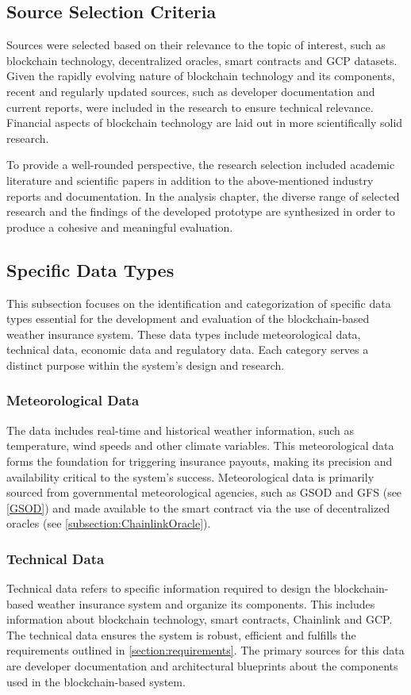 \subsection{Source Selection Criteria}
Sources were selected based on their relevance to the topic of interest, such as blockchain technology, decentralized oracles, smart contracts and GCP datasets. Given the rapidly evolving nature of blockchain technology and its components, recent and regularly updated sources, such as developer documentation and current reports, were included in the research to ensure technical relevance. Financial aspects of blockchain technology are laid out in more scientifically solid research.

To provide a well-rounded perspective, the research selection included academic literature and scientific papers in addition to the above-mentioned industry reports and documentation. In the analysis chapter, the diverse range of selected research and the findings of the developed prototype are synthesized in order to produce a cohesive and meaningful evaluation.

\subsection{Specific Data Types}
This subsection focuses on the identification and categorization of specific data types essential for the development and evaluation of the blockchain-based weather insurance system. These data types include meteorological data, technical data, economic data and regulatory data. Each category serves a distinct purpose within the system's design and research.

\subsubsection{Meteorological Data}
The data includes real-time and historical weather information, such as temperature, wind speeds and other climate variables. This meteorological data forms the foundation for triggering insurance payouts, making its precision and availability critical to the system's success. Meteorological data is primarily sourced from governmental meteorological agencies, such as GSOD and GFS (see \cref{GSOD}) and made available to the smart contract via the use of decentralized oracles (see \cref{subsection:ChainlinkOracle}).

\subsubsection{Technical Data}
Technical data refers to specific information required to design the blockchain-based weather insurance system and organize its components. This includes information about blockchain technology, smart contracts, Chainlink and GCP. The technical data ensures the system is robust, efficient and fulfills the requirements outlined in \cref{section:requirements}. The primary sources for this data are developer documentation and architectural blueprints about the components used in the blockchain-based system.

